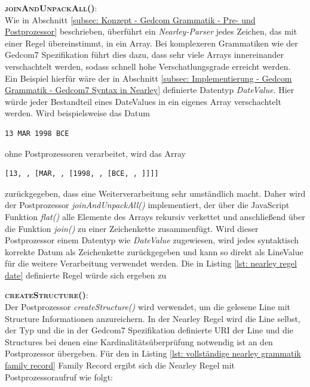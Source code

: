 \vspace{1em}
\textsc{\textbf{joinAndUnpackAll()}:} \vspace{0.5em} \\
Wie in Abschnitt \ref{subsec: Konzept - Gedcom Grammatik - Pre- und Postprozessor} beschrieben, überführt ein \textit{Nearley-Parser} jedes Zeichen, das mit einer Regel übereinstimmt, in ein Array. Bei komplexeren Grammatiken wie der Gedcom7 Spezifikation führt dies dazu, dass sehr viele Arrays innereinander verschachtelt werden, sodass schnell hohe Verschatlungsgrade erreicht werden. Ein Beispiel hierfür wäre der in Abschnitt \ref{subsec: Implementierung - Gedcom Grammatik - Gedcom7 Syntax in Nearley} definierte Datentyp \textit{DateValue}. Hier würde jeder Bestandteil eines DateValues in ein eigenes Array verschachtelt werden. Wird beispielsweise das Datum 
\begin{lstlisting}[frame=none]
			 	13 MAR 1998 BCE
\end{lstlisting}
ohne Postprozessoren verarbeitet, wird das Array
\begin{lstlisting}[frame=none]
		[13, , [MAR, , [1998, , [BCE, , ]]]]
\end{lstlisting}
zurückgegeben, dass eine Weiterverarbeitung sehr umständlich macht. Daher wird der Postprozessor \textit{joinAndUnpackAll()} implementiert, der über die JavaScript Funktion \textit{flat()} alle Elemente des Arrays rekursiv verkettet und anschließend über die Funktion \textit{join()} zu einer Zeichenkette zusammenfügt. Wird dieser Postprozessor einem Datentyp wie \textit{DateValue} zugewiesen, wird jedes syntaktisch korrekte Datum als Zeichenkette zurückgegeben und kann so direkt als LineValue für die weitere Verarbeitung verwendet werden. Die in Listing \ref{lst: nearley regel date} definierte Regel würde sich ergeben zu
\vspace{1em}
\vspace{1em}
\textsc{\textbf{createStructure()}:} \vspace{0.5em} \\
Der Postprozessor \textit{createStructure()} wird verwendet, um die gelesene Line mit Structure Informationen anzureichern. In der Nearley Regel wird die Line selbst, der Typ und die in der Gedcom7 Spezifikation definierte URI der Line und die Structures bei denen eine Kardinalitätsüberprüfung notwendig ist an den Postprozessor übergeben. Für den in Listing \ref{lst: vollständige nearley grammatik family record} Family Record ergibt sich die Nearley Regel mit Postprozessoraufruf wie folgt:
